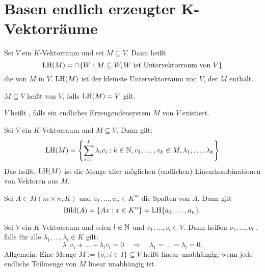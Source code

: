 \newpage
\section{Basen endlich erzeugter $\mathbf{K}$-Vektorräume}

\begin{definition}
	\label{def:I.8.1}
	Sei $V$ ein $K$-Vektorraum und sei $M \subseteq V$.
	Dann heißt
	\[
		\operatorname{LH}(M) = \cap\{W : M \subseteq W, W \text{ ist Untervektorraum von } V\}
	\]
	die  von $M$ in $V$.
	$\operatorname{LH}(M)$ ist der kleinste Untervektorraum von $V$, der $M$ enthält.
	
	$M \subseteq V$ heißt  von $V$, falls $\operatorname{LH}(M) = V$ gilt.
	
	$V$ heißt , falls ein endliches Erzeugendensystem $M$ von $V$ existiert.
\end{definition}

\setcounter{definition}{2}
\begin{lemma}
	\label{lemma:I.8.3}
	Sei $V$ ein $K$-Vektorraum und $M \subseteq V$.
	Dann gilt:
	\[
		\operatorname{LH}(M) = \left\{\sum_{i=1}^{k} \lambda_i v_i : k \in \mathbb{N}, v_1,\dots, v_k \in M, \lambda_1,\dots,\lambda_k\right\}
	\]
	Das heißt, $\operatorname{LH}(M)$ ist die Menge aller möglichen (endlichen) Linearkombinationen von Vektoren aus $M$.
\end{lemma}

\begin{beispiel}
	\label{bsp:I.8.4}
	Sei $A \in M(m \times n, K)$ und $a_1, \dots, a_n \in K^m$ die Spalten von $A$.
	Dann gilt
	\[
		\operatorname{Bild}(A) = \{Ax : x \in K^n\} = \operatorname{LH}\{a_1,\dots,a_n\}.
	\]
\end{beispiel}

\begin{definition}
	\label{def:I.8.5}
	Sei $V$ ein $K$-Vektorraum und seien $l \in \mathbb{N}$ und $v_1,\dots, v_l \in V$.
	Dann heißen $v_1,\dots,v_l$ , falls für alle $\lambda_1, \dots, \lambda_l \in K$ gilt:
	\[
		\lambda_1 v_1 + \dots + \lambda_l v_l = 0 \quad \Rightarrow \quad \lambda_1 = \dots = \lambda_l = 0.
	\]
	Allgemein: Eine Menge $M := \{v_i : i \in I\} \subseteq V$ heißt linear unabhängig, wenn jede endliche Teilmenge von $M$ linear unabhängig ist.
\end{definition}

